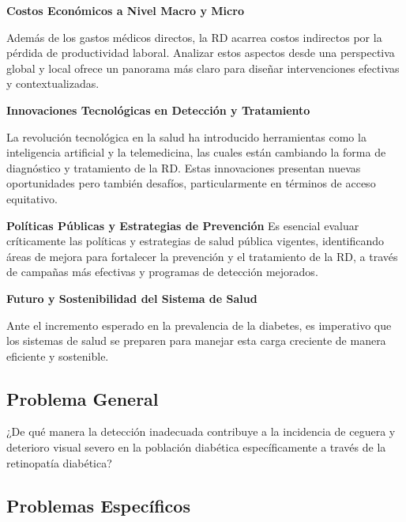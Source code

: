 \textbf{Costos Económicos a Nivel Macro y Micro}

Además de los gastos médicos directos, la RD acarrea costos indirectos por la pérdida de productividad laboral. Analizar estos aspectos desde una perspectiva global y local ofrece un panorama más claro para diseñar intervenciones efectivas y contextualizadas.

\textbf{Innovaciones Tecnológicas en Detección y Tratamiento}

La revolución tecnológica en la salud ha introducido herramientas como la inteligencia artificial y la telemedicina, las cuales están cambiando la forma de diagnóstico y tratamiento de la RD. Estas innovaciones presentan nuevas oportunidades pero también desafíos, particularmente en términos de acceso equitativo.

\textbf{Políticas Públicas y Estrategias de Prevención}
Es esencial evaluar críticamente las políticas y estrategias de salud pública vigentes, identificando áreas de mejora para fortalecer la prevención y el tratamiento de la RD, a través de campañas más efectivas y programas de detección mejorados.

\textbf{Futuro y Sostenibilidad del Sistema de Salud}

Ante el incremento esperado en la prevalencia de la diabetes, es imperativo que los sistemas de salud se preparen para manejar esta carga creciente de manera eficiente y sostenible.

\subsection{Problema General}
\newcommand{\ProblemaGeneral}{
	¿De qué manera la detección inadecuada contribuye a la incidencia de ceguera y deterioro visual severo en la población diabética específicamente a través de la retinopatía diabética?
}
\ProblemaGeneral

\subsection{Problemas Específicos}
\newcommand{\Pbone}{
	¿Hasta qué punto la precisión de los modelos de deep learning en la detección temprana de la retinopatía diabética afecta la tasa de diagnósticos correctos y oportunos en comparación con los métodos convencionales de cribado?
}
\newcommand{\Pbtwo}{
	¿De qué forma la calidad y disponibilidad de los datos de entrenamiento impactan la capacidad de los modelos de deep learning para predecir de manera efectiva la retinopatía diabética, y cuál es su influencia en la prevención de la ceguera en pacientes diabéticos?
}
\newcommand{\Pbthree}{
	¿Cómo incide la variabilidad intra e inter observador en la anotación de datos en la precisión de los modelos de deep learning para detectar la retinopatía diabética en diversas poblaciones?
}
\newcommand{\Pbfour}{
	W
}
\newcommand{\Pbfive}{
	ES
}

